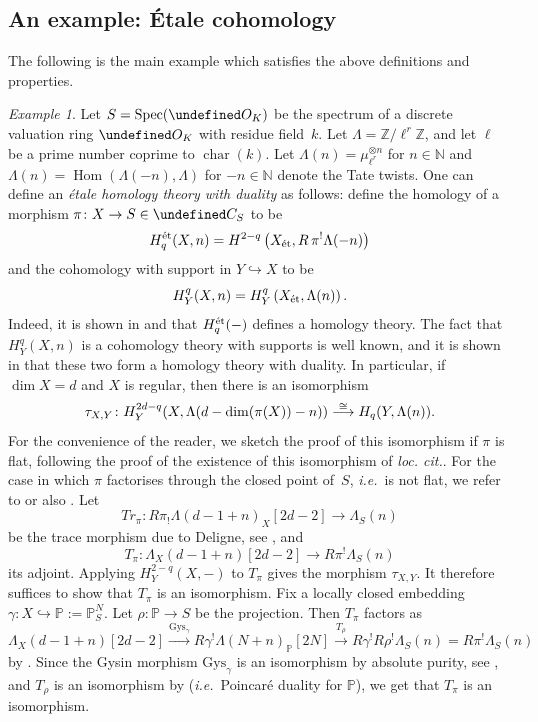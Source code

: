 \documentclass[10pt,a4paper]{article}
\let\cal\undefined
\numberwithin{equation}{section}
\newtheorem{Key lemma}[theorem]{Key lemma}
\theoremstyle{definition}
\theoremstyle{remark}
\newtheorem{example}[theorem]{Example}
\newcommand{\bb}{\mathbb}
\newcommand{\sub}[1]{{\mbox{\rm \scriptsize #1}}}
\newcommand{\To}{\longrightarrow}
\newcommand{\xto}{\xrightarrow}
\newcommand{\cal}{\mathcal}
\DeclareMathOperator{\Char}{char}
\DeclareMathOperator{\Hom}{Hom}
\DeclareMathOperator{\Spec}{Spec}
\newcommand{\xTo}[1]{\stackrel{#1}{\To}}
\newcommand{\Gys}{\mathrm{Gys}}
\def\lowcong{\vbox to 0pt{\vss\hbox{$\scriptstyle\cong$}\vskip-1.2pt}}
\begin{document}
\subsection{An example: \'Etale cohomology}\label{subsection_example_etale_cohom}
The following is the main example which satisfies the above definitions and properties. 

\begin{example}\label{PBexam3}
Let $S=\Spec (\cal O_K)$ be the spectrum of a  
discrete valuation ring $\cal O_K$ with residue field~$k$. 
Let $\Lambda=\bb Z/\ell^r\bb Z$, and let $\ell$ be a prime number coprime to $\Char(k)$. Let $\Lambda(n)=\mu_{\ell^r}^{\otimes n}$ for $n\in \bb N$ and  $\Lambda(n)=\Hom(\Lambda(-n),\Lambda)$ for $-n\in \bb N$ denote the Tate twists. One can define an \textit{\'etale homology theory with duality} as follows: define the homology of a morphism $\pi\colon X\to S\in \cal C_S$ to be
\[
H^\sub{\'et}_q(X,n) = H^{2-q}\left(X_\sub{\'et} , R\, \pi^! \Lambda (-n)\right) 
\]
and the cohomology with support in $Y\hookrightarrow X$ to be
\[
H_Y^q (X,n ) = H^{q}_Y\left(X_\sub{\'et} ,\Lambda (n)\right) .
\]
Indeed, it is shown in \cite[Example~2.2]{JS03}
and \cite[Proposition~1.5]{SS10} that $H^\sub{\'et}_q(-)$ defines a homology theory. The fact that $H_Y^q (X,n )$ is a  cohomology theory with supports is well known, and it is shown in \cite[Lemma~1.8]{SS10} that these two form a homology theory with duality. In particular, if $\dim X=d$ and $X$ is regular, then there is an isomorphism
$$\tau_{X,Y}\colon H_Y^{2d-q}(X,\Lambda(d-\dim(\pi(X))-n))\xTo{\lowcong} H_q(Y,\Lambda(n)).$$ 
For the convenience of the reader, we sketch the proof of this isomorphism if $\pi$ is flat, following the proof of the existence of this isomorphism of \textit{loc. cit.}. For the case in which $\pi$ factorises through the closed point of~$S$, \textit{i.e.}~is not flat, we refer to \cite[Section~2]{BO74} or also \cite[Lemma~1.8]{SS10}. Let
$$Tr_\pi\colon R\pi_!\Lambda(d-1+n)_X[2d-2]\To \Lambda_S(n)$$
be the trace morphism due to Deligne, see \cite[Theorem XVIII.2.9]{SGA4}, and
$$T_\pi\colon \Lambda_X(d-1+n)[2d-2]\To R\pi^!\Lambda_S(n)$$
its adjoint.
Applying $H^{2-q}_Y(X,-)$ to $T_\pi$ gives the morphism $\tau_{X,Y}$. It therefore suffices to show that $T_\pi$ is an isomorphism. Fix a locally closed embedding $\gamma\colon X\hookrightarrow \bb P:=\bb P^N_S$. Let $ \rho\colon\bb P\to S$ be the projection. Then $T_\pi$ factors as 
$$\Lambda_X(d-1+n)[2d-2]\xto{\Gys_\gamma} R\gamma^!\Lambda(N+n)_{\bb P}[2N] \xTo{T_\rho} R\gamma^!R\rho^! \Lambda_S(n)= R\pi^!\Lambda_S(n)$$
by \cite[Theorem 4.2.3.8(i)]{DeligneSGA}. Since the Gysin morphism $\Gys_\gamma$ is an isomorphism by absolute purity, see \cite{Fuj02}, and $T_\rho$ is an isomorphism by \cite[Theorem XVIII.3.2.5]{SGA4} (\textit{i.e.}~Poincar\'e duality for $\bb P$), we get that $T_\pi$ is an isomorphism.
\end{example}
\end{document}
